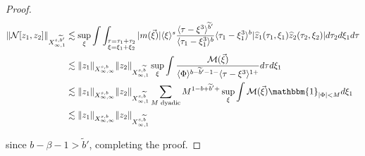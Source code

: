 \documentclass[a4paper,
11pt,  reqno]{amsart}
\newcommand{\jap}[1]{\langle #1 \rangle}
\newcommand{\5}{\textup{V}}
\newcommand{\noi}{\noindent}
\newcommand{\ft}{\widehat}
\newcommand{\wt}{\widetilde}
\theoremstyle{remark}
\newcommand{\be}{\beta}
\newcommand{\jb}[1]
{\langle #1 \rangle}
\numberwithin{equation}{section}
\numberwithin{theorem}{section}
\newcommand{\Ncal}{\mathcal{N}}
\begin{document}
\begin{proof}
			\begin{align}
				\|\Ncal[z_1,z_2]\|_{X^{s,\wt{b}'}_{\infty,1}}
&
\lesssim \sup_\xi \int \int_{\substack{\tau=\tau_1+\tau_2\\ \xi=\xi_1+\xi_2}}
|m(\vec\xi)|
\jb{\xi}^s \frac{\jap{\tau-\xi^3}^{\wt{b}'}}{\jap{\tau_1-\xi_1^3}^b} \jap{\tau_1-\xi_1^3}^b
|\ft{z}_1(\tau_1, \xi_1)
\ft{z}_2(\tau_2, \xi_2)
|
 d\tau_2 d\xi_1 d\tau
 \\
&
\lesssim
\|z_1\|_{X^{s,b}_{\infty,\infty}} \|z_2\|_{X^{s,\wt{b}}_{\infty,1}}
\sup_\xi \int \frac{\mathcal{M}(\vec\xi)}{\jap{\Phi}^{b-\wt{b}'-1-}\jap{\tau-\xi^3}^{1+} } d\tau d\xi_1
\\
&
\lesssim
\|z_1\|_{X^{s,b}_{\infty,\infty}} \|z_2\|_{X^{s,\wt{b}}_{\infty,1}}
\sum_{M \text{ dyadic}} M^{1-b+\wt{b}'+} \sup_\xi \int \mathcal{M}(\vec\xi) \mathbbm{1}_{|\Phi|<M} d\xi_1
\\
&
 \lesssim\|z_1\|_{X^{s,b}_{\infty,\infty}}  \|z_2\|_{X^{s,\wt{b}}_{\infty,1}}
			\end{align}

            \noi
			since $b- \be - 1 >\wt b '$, completing the proof.

		\end{proof}
\end{document}

